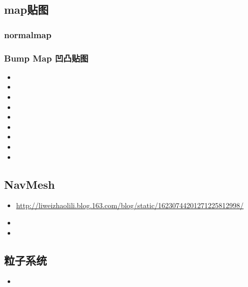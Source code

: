 \documentclass[9pt, b5paper]{article}
\begin{document}
\subsection{map贴图}
\label{sec:org03938ba}
\subsubsection{normalmap}
\label{sec:orgdfcd2b0}
\subsubsection{Bump Map 凹凸贴图}
\label{sec:org4b2a5d2}
\begin{itemize}
\item 

\item 

\item 

\item 

\item 

\item 

\item 

\item 

\item 
\end{itemize}

\subsection{NavMesh}
\label{sec:orgfc6a1ca}
\begin{itemize}
\item \url{http://liweizhaolili.blog.163.com/blog/static/16230744201271225812998/}
\item 

\item 
\end{itemize}
\subsection{粒子系统}
\label{sec:org5798f43}
\begin{itemize}
\item 
\end{itemize}
\end{document}
